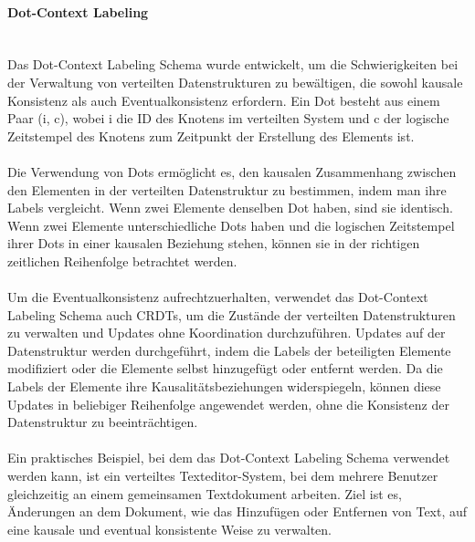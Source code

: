 \documentclass[../vs-script-first-v01.tex]{subfiles}
\begin{document}
\paragraph{Dot-Context Labeling}\mbox{}\\
Das Dot-Context Labeling Schema wurde entwickelt, um die Schwierigkeiten bei der Verwaltung von verteilten Datenstrukturen zu bewältigen, die sowohl kausale Konsistenz als auch Eventualkonsistenz erfordern. Ein Dot besteht aus einem Paar (i, c), wobei i die ID des Knotens im verteilten System und c der logische Zeitstempel des Knotens zum Zeitpunkt der Erstellung des Elements ist.
\\\\
Die Verwendung von Dots ermöglicht es, den kausalen Zusammenhang zwischen den Elementen in der verteilten Datenstruktur zu bestimmen, indem man ihre Labels vergleicht. Wenn zwei Elemente denselben Dot haben, sind sie identisch. Wenn zwei Elemente unterschiedliche Dots haben und die logischen Zeitstempel ihrer Dots in einer kausalen Beziehung stehen, können sie in der richtigen zeitlichen Reihenfolge betrachtet werden.
\\\\
Um die Eventualkonsistenz aufrechtzuerhalten, verwendet das Dot-Context Labeling Schema auch CRDTs, um die Zustände der verteilten Datenstrukturen zu verwalten und Updates ohne Koordination durchzuführen. Updates auf der Datenstruktur werden durchgeführt, indem die Labels der beteiligten Elemente modifiziert oder die Elemente selbst hinzugefügt oder entfernt werden. Da die Labels der Elemente ihre Kausalitätsbeziehungen widerspiegeln, können diese Updates in beliebiger Reihenfolge angewendet werden, ohne die Konsistenz der Datenstruktur zu beeinträchtigen.
\\\\
Ein praktisches Beispiel, bei dem das Dot-Context Labeling Schema verwendet werden kann, ist ein verteiltes Texteditor-System, bei dem mehrere Benutzer gleichzeitig an einem gemeinsamen Textdokument arbeiten. Ziel ist es, Änderungen an dem Dokument, wie das Hinzufügen oder Entfernen von Text, auf eine kausale und eventual konsistente Weise zu verwalten.
\end{document}

